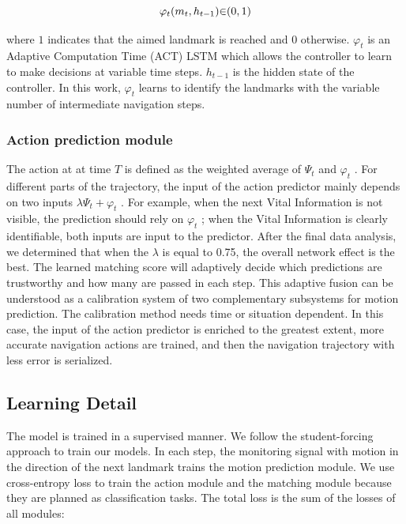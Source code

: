 \begin{equation}
	\centering
	{\varphi}_{t}({m}_{t},{h}_{t-1}){\in}{({0},{1})}
\end{equation}

where ${1}$ indicates that the aimed landmark is reached and ${0}$ otherwise. ${{\varphi}_{t}}$ is an Adaptive Computation Time (ACT) LSTM which allows the controller to learn to make decisions at variable time steps. ${h}_{t-1}$ is the hidden state of the controller. In this work, ${{\varphi}_{t}}$ learns to identify the landmarks with the variable number of intermediate navigation steps.

\subsubsection{Action prediction module}
	
The action at at time ${T}$ is defined as the weighted average of ${{\Psi}_{t}}$ and ${{\varphi}_{t}}$ . For different parts of the trajectory, the input of the action predictor mainly depends on  two inputs ${{\lambda}{\Psi}_{t} + {\varphi}_{t}}$ . For example, when the next Vital Information is not visible, the prediction should rely on ${{\varphi}_{t}}$ ; when the Vital Information is clearly identifiable, both inputs are input to the predictor. After the final data analysis, we determined that when the ${\lambda}$  is equal to 0.75, the overall network effect is the best. The learned matching score will adaptively decide which predictions are trustworthy and how many are passed in each step. This adaptive fusion can be understood as a calibration system of two complementary subsystems for motion prediction. The calibration method needs time or situation dependent. In this case, the input of the action predictor is enriched to the greatest extent, more accurate navigation actions are trained, and then the navigation trajectory with less error is serialized.
	
\subsection{Learning Detail}
	
The model is trained in a supervised manner. We follow the student-forcing approach to train our models. In each step, the monitoring signal with motion in the direction of the next landmark trains the motion prediction module. We use cross-entropy loss to train the action module and the matching module because they are planned as classification tasks. The total loss is the sum of the losses of all modules:
	
